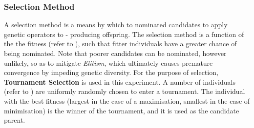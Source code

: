 \documentclass[a4paper,12pt]{article}
\begin{document}
        \subsubsection*{Selection Method} \label{subsubsec:selection}
            \par{
                A selection method is a means by which to nominated candidates to apply genetic operators to - producing offspring. The selection method is a function of the the fitness (refer to ),
                such that fitter individuals have a greater chance of being nominated. Note that poorer candidates can be nominated, however unlikely, so as to mitigate \textit{Elitism}, which ultimately
                causes premature convergence by impeding genetic diversity.\newline 
                \newline 
                For the purpose of selection, \textbf{Tournament Selection} is used in this experiment. A number of individuals (refer to ) are uniformly randomly chosen to enter a 
                tournament. The individual with the best fitness (largest in the case of a maximisation, smallest in the case of minimisation) is the winner of the tournament, and it is used as the candidate parent. 
            }
        \newpage
\end{document}

